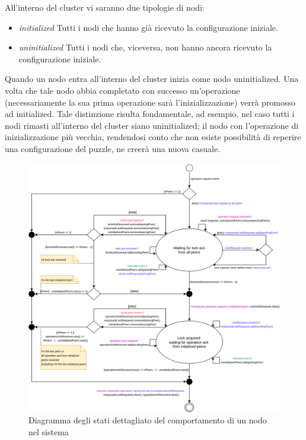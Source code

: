 \noindent All'interno del cluster vi saranno due tipologie di nodi:
\begin{itemize}
    \item \textit{initialized}\newline
    Tutti i nodi che hanno già ricevuto la configurazione iniziale.
    \item \textit{uninitialized}\newline
    Tutti i nodi che, viceversa, non hanno ancora ricevuto la configurazione iniziale.
\end{itemize}
Quando un nodo entra all'interno del cluster inizia come nodo uninitialized. Una volta che tale nodo abbia completato con successo un'operazione (necessariamente la sua prima operazione sarà l'inizializzazione) verrà promosso ad initialized.\newline
Tale distinzione risulta fondamentale, ad esempio, nel caso tutti i nodi rimasti all'interno del cluster siano uninitialized; il nodo con l'operazione di inizializzazione più vecchia, rendendosi conto che non esiste possibilità di reperire una configurazione del puzzle, ne creerà una nuova casuale.\newline

\begin{figure}[H]
	\begin{center}
		\includegraphics[width=1\linewidth]{img/part-2/operation.png}
	\end{center}
	\caption{Diagramma degli stati dettagliato del comportamento di un nodo nel sistema}
\end{figure}

